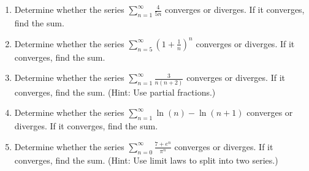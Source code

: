 \documentclass[12pt]{article}
\begin{document}
\begin{enumerate}
\[1-\frac{1}{\sqrt{3}}+\frac{1}{3}-\frac{1}{3\sqrt{3}}+\frac{1}{9}-\frac{1}{9\sqrt{3}}+\cdots\]
\vfill
\item Determine whether the series $\displaystyle \sum_{n = 1}^\infty \frac{4}{5n}$ converges or diverges.  If it converges, find the sum.
\vfill

\item Determine whether the series $\displaystyle \sum_{n = 5}^\infty \left(1 + \frac{1}{n}\right)^n$ converges or diverges.  If it converges, find the sum.
\vfill
\newpage

\item Determine whether the series $\displaystyle\sum_{n=1}^{\infty}\displaystyle\frac{3}{n(n+2)}$ converges or diverges. If it converges, find the sum. (Hint: Use partial fractions.)

\vfill

\item Determine whether the series $\displaystyle\sum_{n=1}^{\infty}\ln(n) - \ln(n + 1)$ converges or diverges. If it converges, find the sum.

\vfill

\item Determine whether the series $\displaystyle\sum_{n=0}^{\infty}\frac{7 + e^n}{\pi^n}$ converges or diverges. If it converges, find the sum. (Hint: Use limit laws to split into two series.)


\end{enumerate}
\end{document}
